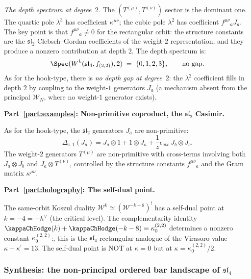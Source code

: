 \begin{computation}
\emph{The depth spectrum at degree~$2$.} The
$(T^{(\mu)}, T^{(\nu)})$ sector is the dominant one.
The quartic pole $\lambda^3$ has coefficient
$\kappa^{\mu\nu}$; the cubic pole $\lambda^2$ has
coefficient $f^{\mu\nu}{}_a J_a$. The key point is that
$f^{\mu\nu}{}_a \neq 0$ for the rectangular orbit:
the structure constants are the $\mathfrak{sl}_2$
Clebsch--Gordan coefficients of the weight-$2$
representation, and they produce a nonzero contribution
at depth $2$. The depth spectrum is:
\begin{equation}\label{eq:sl4rect-spec-2}
\Spec(W^k(\mathfrak{sl}_4, f_{(2,2)}), 2)
\;=\;
\{0, 1, 2, 3\},
\qquad
\text{no gap.}
\end{equation}
As for the hook-type, there is \emph{no depth gap at
degree~$2$}: the $\lambda^2$ coefficient fills in depth $2$
by coupling to the weight-$1$ generators $J_a$ (a mechanism
absent from the principal $\mathcal W_N$, where no
weight-$1$ generator exists).

\medskip
\noindent\textbf{Part~\ref{part:examples}: Non-primitive coproduct,
the $\mathfrak{sl}_2$ Casimir.}

As for the hook-type, the $\mathfrak{sl}_2$ generators
$J_a$ are non-primitive:
\[
\Delta_{z,1}(J_a) = J_a \otimes 1 + 1 \otimes J_a
+ \frac{1}{z}\epsilon_{abc}\, J_b \otimes J_c.
\]
The weight-$2$ generators $T^{(\mu)}$ are non-primitive
with cross-terms involving both $J_a \otimes J_b$ and
$J_a \otimes T^{(\nu)}$, controlled by the structure
constants $f^{\mu\nu}{}_a$ and the Gram matrix
$\kappa^{\mu\nu}$.

\medskip
\noindent\textbf{Part~\ref{part:holography}: The self-dual point.}

The same-orbit Koszul duality
$\mathcal W^k \simeq (\mathcal W^{-k-8})^!$ has a
self-dual point at $k = -4 = -h^\vee$ (the critical
level). The complementarity identity
$\kappaChHodge(k) + \kappaChHodge(-k-8) = \kappa_0^{(2,2)}$ determines
a nonzero constant $\kappa_0^{(2,2)}$:, this is
the $\mathfrak{sl}_4$ rectangular analogue of the
Virasoro value $\kappa + \kappa^! = 13$. The self-dual
point is NOT at $\kappa = 0$ but at
$\kappa = \kappa_0^{(2,2)}/2$.
\end{computation}

\subsubsection{Synthesis: the non-principal ordered bar
landscape of $\mathfrak{sl}_4$}
\label{subsubsec:sl4-landscape-synthesis}


